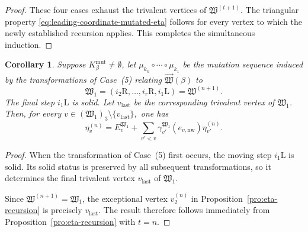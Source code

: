 \documentclass[12pt, reqno]{amsart}
\theoremstyle{plain}
\newtheorem{corollary}[theorem]{Corollary}
\theoremstyle{definition}
\numberwithin{equation}{section}
\begin{document}
\begin{proof}
These four cases exhaust the trivalent vertices of
\(\mathfrak W^{(t+1)}\). The triangular property
\eqref{eq:leading-coordinate-mutated-eta} follows for every vertex
to which the newly established recursion applies. This completes the
simultaneous induction.
\end{proof}

\begin{corollary}\label{cor:etavn}
Suppose $K_\beta^{\mathrm{mut}}\neq\emptyset$, let
\(
    \mu_{k_n}\circ\cdots\circ\mu_{k_1}
\)
be the mutation sequence induced by the transformations of
Case~\textup{(5)} relating
\(\overrightarrow{\mathfrak W}(\beta)\) to
\begin{equation}\label{eq:final-shifted-double-inductive-weave}
    \mathfrak W_1
    =
    (i_2\mathrm R,\ldots,i_r\mathrm R,i_1\mathrm L)
    =
    \mathfrak W^{(n+1)}.
\end{equation}
The final step \(i_1\mathrm L\) is solid. Let
\(v_{\mathrm{last}}\) be the corresponding trivalent vertex of
\(\mathfrak W_1\). Then, for every
\(
    v\in
    (\mathfrak W_1)_3\setminus\{v_{\mathrm{last}}\},
\)
one has
\begin{equation}\label{eq:final-eta-recursion}
    \eta_v^{(n)}
    =
    E_v^{\mathfrak W_1}
    +
    \sum_{v'<v}
    \gamma_{v'}^{\mathfrak W_1}
        (e_{v,\mathrm{nw}})
    \eta_{v'}^{(n)}.
\end{equation}
\end{corollary}

\begin{proof}
When the transformation of Case~\textup{(5)} first occurs, the
moving step \(i_1\mathrm L\) is solid. Its solid status is preserved
by all subsequent transformations, so it determines the final
trivalent vertex \(v_{\mathrm{last}}\) of \(\mathfrak W_1\).

Since
\(\mathfrak W^{(n+1)}=\mathfrak W_1\), the exceptional vertex
\(v_2^{(n)}\) in Proposition~\ref{pro:eta-recursion} is precisely
\(v_{\mathrm{last}}\). The result therefore follows immediately
from Proposition~\ref{pro:eta-recursion} with \(t=n\).
\end{proof}
\end{document}
